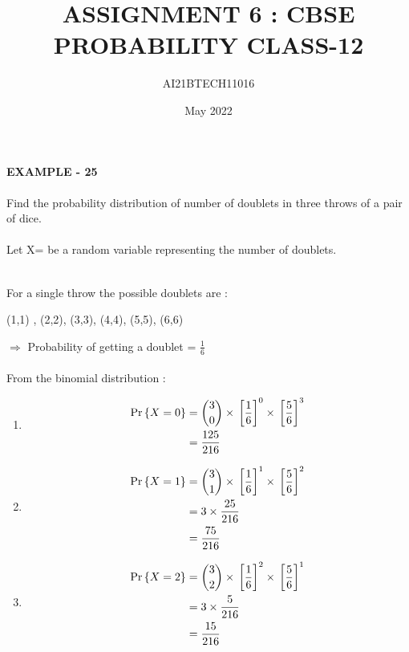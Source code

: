 \documentclass[journal,12pt,twocolumn]{IEEEtran}
\begin{document}
\vspace{3cm}
       
\title{ASSIGNMENT 6 : CBSE PROBABILITY CLASS-12} 
\author{AI21BTECH11016} 
\date{May 2022}     


\maketitle

\newpage

\bigskip


\textbf{EXAMPLE - 25}\\

\question \\
Find the probability distribution of number of doublets in three throws of
a pair of dice.\\

\solution \\
Let X= be a random variable representing the number of doublets.\\\\

\begin{table}[ht!]
    \centering
    
    \caption{}
    \label{table:table1}
\end{table}

\text For a single throw the possible doublets are :
\begin{center}
\text (1,1) , (2,2), (3,3), (4,4), (5,5), (6,6)
\end{center}
$\Rightarrow$ Probability of getting a doublet = $\frac{1}{6}$ \\\\
\text From the binomial distribution :\\

\begin{enumerate}[label=(\roman*)]
\item 
\begin{align}
\Pr\left\{X = 0\right\} & = {3 \choose 0} \times {}\left[\frac{1}{6}\right]^0 \times {}\left[\frac{5}{6}\right]^3\\ & = \frac{125}{216}
\end{align}

\item 
\begin{align}
\Pr\left\{X = 1\right\} & = {3 \choose 1} \times {}\left[\frac{1}{6}\right]^1 \times {}\left[\frac{5}{6}\right]^2\\ & = 3 \times \frac{25}{216}\\ & = \frac{75}{216}
\end{align}

\item
\begin{align}
\Pr\left\{X = 2\right\} & = {3 \choose 2} \times {}\left[\frac{1}{6}\right]^2 \times {}\left[\frac{5}{6}\right]^1\\ & = 3 \times \frac{5}{216}\\ & = \frac{15}{216}
\end{align}
\end{enumerate}
\end{document}
